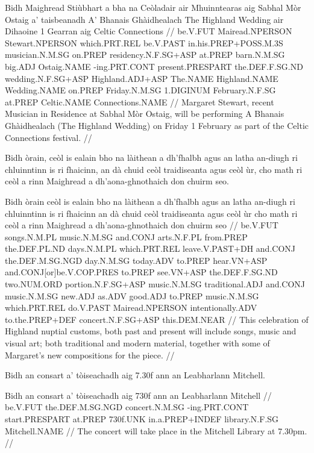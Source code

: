 \documentclass[a4paper,10pt]{article}
\begin{document}
\vspace{4mm}
\gla Bidh Maighread Stiùbhart a bha na Ceòladair air Mhuinntearas aig Sabhal Mòr Ostaig a' taisbeanadh A' Bhanais Ghàidhealach The Highland Wedding air Dihaoine 1 Gearran aig Celtic Connections  //
\glb be.V.FUT Mairead.NPERSON Stewart.NPERSON which.PRT.REL be.V.PAST in.his.PREP+POSS.M.3S musician.N.M.SG on.PREP residency.N.F.SG+ASP at.PREP barn.N.M.SG big.ADJ Ostaig.NAME -ing.PRT.CONT present.PRESPART the.DEF.F.SG.ND wedding.N.F.SG+ASP Highland.ADJ+ASP The.NAME Highland.NAME Wedding.NAME on.PREP Friday.N.M.SG 1.DIGINUM February.N.F.SG at.PREP Celtic.NAME Connections.NAME  //
\glft Margaret Stewart, recent Musician in Residence at Sabhal Mòr Ostaig, will be performing A Bhanais Ghàidhealach (The Highland Wedding) on Friday 1 February as part of the Celtic Connections festival. //
\endgl
\xe

\ex
\begingl
\glpre Bidh òrain, ceòl is ealain bho na làithean a dh'fhalbh agus an latha an-diugh ri chluinntinn is ri fhaicinn, an dà chuid ceòl traidiseanta agus ceòl ùr, cho math ri ceòl a rinn Maighread a dh'aona-ghnothaich don chuirm seo. 

\vspace{4mm}
\gla Bidh òrain ceòl is ealain bho na làithean a dh'fhalbh agus an latha an-diugh ri chluinntinn is ri fhaicinn an dà chuid ceòl traidiseanta agus ceòl ùr cho math ri ceòl a rinn Maighread {a dh'aona-ghnothaich} don chuirm seo  //
\glb be.V.FUT songs.N.M.PL music.N.M.SG and.CONJ arts.N.F.PL from.PREP the.DEF.PL.ND days.N.M.PL which.PRT.REL leave.V.PAST+DH and.CONJ the.DEF.M.SG.NGD day.N.M.SG today.ADV to.PREP hear.VN+ASP and.CONJ[or]be.V.COP.PRES to.PREP see.VN+ASP the.DEF.F.SG.ND two.NUM.ORD portion.N.F.SG+ASP music.N.M.SG traditional.ADJ and.CONJ music.N.M.SG new.ADJ as.ADV good.ADJ to.PREP music.N.M.SG which.PRT.REL do.V.PAST Mairead.NPERSON intentionally.ADV to.the.PREP+DEF concert.N.F.SG+ASP this.DEM.NEAR  //
\glft This celebration of Highland nuptial customs, both past and present will include songs, music and visual art; both traditional and modern material, together with some of Margaret's new compositions for the piece. //
\endgl
\xe

\ex
\begingl
\glpre Bidh an consart a' tòiseachadh aig 7.30f ann an Leabharlann Mitchell. 

\vspace{4mm}
\gla Bidh an consart a' tòiseachadh aig 730f {ann an} Leabharlann Mitchell  //
\glb be.V.FUT the.DEF.M.SG.NGD concert.N.M.SG -ing.PRT.CONT start.PRESPART at.PREP 730f.UNK in.a.PREP+INDEF library.N.F.SG Mitchell.NAME  //
\glft The concert will take place in the Mitchell Library at 7.30pm. //
\endgl
\xe
\end{document}
